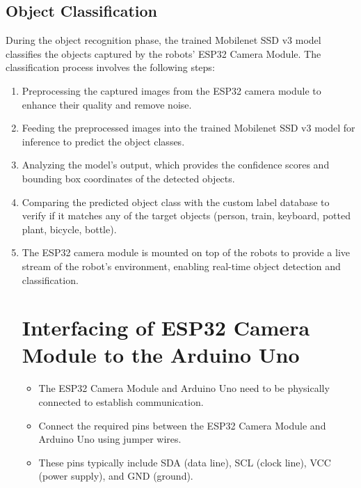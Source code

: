 \documentclass[a4paper,12pt,oneside]{book}
\begin{document}
\subsection{Object Classification}
During the object recognition phase, the trained Mobilenet SSD v3 model classifies the objects captured by the robots' ESP32 Camera Module. The classification process involves the following steps:
\begin{enumerate}
  \item Preprocessing the captured images from the ESP32 camera module to enhance their quality and remove noise.
  \item Feeding the preprocessed images into the trained Mobilenet SSD v3 model for inference to predict the object classes.
  \item Analyzing the model's output, which provides the confidence scores and bounding box coordinates of the detected objects.
  \item Comparing the predicted object class with the custom label database to verify if it matches any of the target objects (person, train, keyboard, potted plant, bicycle, bottle).
  \item The ESP32 camera module is mounted on top of the robots to provide a live stream of the robot's environment, enabling real-time object detection and classification.
\raggedleft
\newpage
\section{Interfacing of ESP32 Camera Module to the Arduino Uno}

\begin{itemize}
  \item The ESP32 Camera Module and Arduino Uno need to be physically connected to establish communication.
  \item Connect the required pins between the ESP32 Camera Module and Arduino Uno using jumper wires.
  \item These pins typically include SDA (data line), SCL (clock line), VCC (power supply), and GND (ground).
\end{itemize}


\end{enumerate}
\end{document}
